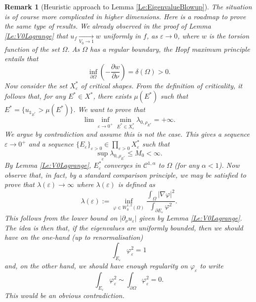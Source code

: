 \documentclass{article}
\renewcommand{\leq}{\leqslant}
\def\e{{\varepsilon}}
\newtheorem{remark}[material]{Remark}
\def\O{{\Omega}}
\def\n{{\nabla}}
\def\p{{\varphi}}
\numberwithin{equation}{section}
\begin{document}
\begin{remark}[Heuristic approach to Lemma \ref{Le:EigenvalueBlowup}]
The situation is of course more complicated in higher dimensions. Here is a roadmap to prove the same type of results. We already observed in the proof of Lemma \ref{Le:V0Lagrange} that $u_f\underset{V_0\to 1}\rightarrow w$ uniformly in $f$, as $\e\to 0$, where $w$ is the torsion function of the set $\O$. As $\O$ has a regular boundary, the Hopf maximum principle entails that 
\[ \inf_{\partial \O}\left(-\frac{\partial w}{\partial \nu}\right)=\delta(\O)>0.\]
Now consider the set $X^*_\e$ of critical shapes. From the definition of criticality, it follows that, for any $E^*\in X^*$, there exists $\mu(E^*)$ such that $E^*=\{u_{\mathds 1_{E^*}}>\mu(E^*)\}$. 
We want to prove that 
\[ \lim\inf_{\e \to 0^+}\min_{E^*\in X^*_\e}\lambda_{0,\rho_{E^*}}=+\infty.\] We argue by contradiction and assume this is not the case. This gives a sequence $\e\to 0^+$ and a sequence $\{E_\e\}_{\e>0}\in \prod_{\e>0}X^*_\e$ such that
\[\sup_\e \lambda_{0,\rho_{E^*}}\leq M_0<\infty.\] By Lemma \ref{Le:V0Lagrange}, $E^*_\e$ converges in $\mathscr C^{1,\alpha}$ to $\O$ (for any $\alpha<1$).  Now observe that, in fact, by a standard comparison principle, we may be satisfied to prove that $\lambda(\e)\to \infty$ where $\lambda(\e)$ is defined as 
\[ \lambda(\e):=\inf_{\p\in W^{1,2}_0(\O)}\frac{\int_\O |\n \p|^2}{\int_{\partial E_\e}\p^2}.\] This follows from the lower bound on $|\partial_\nu u_\e|$ given by Lemma \ref{Le:V0Lagrange}. The idea is then that, if the eigenvalues are uniformly bounded, then we should have on the one-hand (up to renormalisation)
\[ \int_{E_\e}\p_\e^2=1\] 
and, on the other hand, we should have enough regularity on $\p_\e$ to write 
\[ \int_{E_\e}\p_\e^2\sim \int_{\partial \O}\p_\e^2=0.\] This would be an obvious contradiction.
\end{remark}
\end{document}
